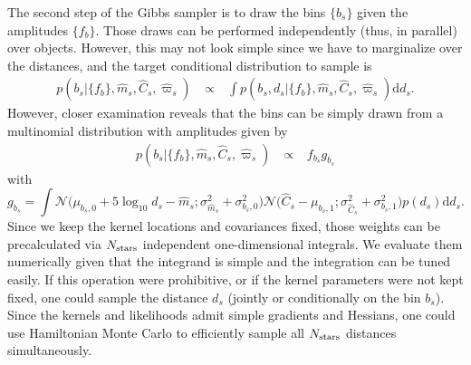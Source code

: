 \documentclass[manuscript, letterpaper]{aastex6}
\makeatletter
\let\origsubsection\subsection
\renewcommand\subsection{\@ifstar{\starsubsection}{\nostarsubsection}}
\newcommand\nostarsubsection[1]{\subsectionprelude\origsubsection{#1}}
\newcommand\starsubsection[1]{\subsectionprelude\origsubsection*{#1}}
\newcommand\subsectionprelude{\vspace{1em}}
\newcommand{\eg}{{\textit{e.g.},~}}
\newcommand{\equ}[1]{\begin{equation}#1\end{equation}}
\newcommand{\eqn}[1]{\begin{eqnarray}#1\end{eqnarray}}
\newcommand{\nobj}{{N_{\rm stars}}}
\makeatother
\begin{document}
The second step of the Gibbs sampler is to draw the bins $\{b_s\}$ given the amplitudes $\{f_b\}$. 
Those draws can be performed independently (thus, in parallel) over objects.
However, this may not look simple since we have to marginalize over the distances, and the target conditional distribution to sample is
\eqn{
	p\left(b_s \bigr\rvert \bigl\{ f_b \bigr\}, \hat{m}_s, \hat{C}_s, \hat{\varpi}_s\right) \ &\propto& \  \int p\left(b_s, d_s \bigr\rvert \bigl\{ f_b \bigr\}, \hat{m}_s, \hat{C}_s, \hat{\varpi}_s\right)  \mathrm{d} d_s.
}  
However, closer examination reveals that the bins can be simply drawn from a multinomial distribution with amplitudes given by
\eqn{
	p\left(b_s \bigr\rvert \bigl\{ f_b \bigr\}, \hat{m}_s, \hat{C}_s, \hat{\varpi}_s\right) \ &\propto& \ f_{b_s}  g_{b_s}
} 
with
\equ{
	g_{b_s} = \int \mathcal{N}\bigl( \mu_{b_s,0} + 5\log_{10}d_s  -\hat{m}_s ;\sigma_{\hat{m}_s}^2 + \sigma_{b_s,0}^2 \bigr)   \mathcal{N}\bigl(\hat{C}_s - \mu_{b_s,1};\sigma_{\hat{C}_s}^2 + \sigma_{b_s,1}^2 \bigr) p(d_s)  \mathrm{d}  d_s.
}
Since we keep the kernel locations and covariances fixed, those weights can be precalculated via $\nobj$ independent one-dimensional integrals.
We evaluate them numerically given that the integrand is simple and the integration can be tuned easily. 
If this operation were prohibitive, or if the kernel parameters were not kept fixed, one could sample the distance $d_s$ (jointly or conditionally on the bin $b_s$).
Since the kernels and likelihoods admit simple gradients and Hessians, one could use Hamiltonian Monte Carlo \citep[\eg][]{Duane1987, Neal2012} to efficiently sample all $\nobj$ distances simultaneously.


\subsection{Discussion}
\end{document}
